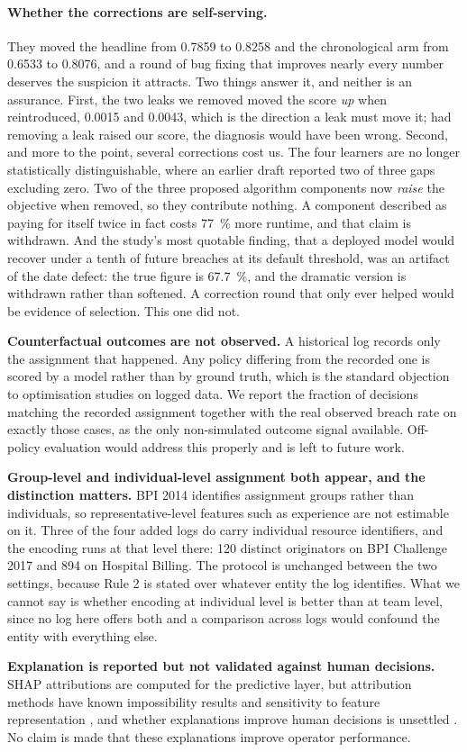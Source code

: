 \paragraph{Whether the corrections are self-serving.} They moved the headline from
\num{0.7859} to \num{0.8258} and the chronological arm from \num{0.6533} to \num{0.8076}, and a
round of bug fixing that improves nearly every number deserves the suspicion it attracts. Two
things answer it, and neither is an assurance. First, the two leaks we removed moved the score
\emph{up} when reintroduced, \num{0.0015} and \num{0.0043}, which is the direction a leak must move it;
had removing a leak raised our score, the diagnosis would have been wrong. Second, and more
to the point, several corrections cost us. The four learners are no longer statistically
distinguishable, where an earlier draft reported two of three gaps excluding zero. Two of
the three proposed algorithm components now \emph{raise} the objective when removed, so
they contribute nothing. A component described as paying for itself twice in fact costs
\SI{77}{\percent} more runtime, and that claim is withdrawn. And the study's most quotable finding,
that a deployed model would recover under a tenth of future breaches at its default
threshold, was an artifact of the date defect: the true figure is \SI{67.7}{\percent}, and the
dramatic version is withdrawn rather than softened. A correction round that only ever helped
would be evidence of selection. This one did not.

\textbf{Counterfactual outcomes are not observed.} A historical log records only the
assignment that happened. Any policy differing from the recorded one is scored by a model
rather than by ground truth, which is the standard objection to optimisation studies on
logged data. We report the fraction of decisions matching the recorded assignment together
with the real observed breach rate on exactly those cases, as the only non-simulated outcome
signal available. Off-policy evaluation would address this properly and is left to future
work.

\textbf{Group-level and individual-level assignment both appear, and the distinction matters.}
BPI 2014 identifies assignment groups rather than individuals, so representative-level features
such as experience are not estimable on it. Three of the four added logs do carry individual
resource identifiers, and the encoding runs at that level there: \num{120} distinct originators
on BPI Challenge 2017 and \num{894} on Hospital Billing. The protocol is unchanged between the
two settings, because Rule 2 is stated over whatever entity the log identifies. What we cannot
say is whether encoding at individual level is better than at team level, since no log here
offers both and a comparison across logs would confound the entity with everything else.

\textbf{Explanation is reported but not validated against human decisions.} SHAP attributions
are computed for the predictive layer, but attribution methods have known impossibility
results \citep{bilodeau2024impossibility} and sensitivity to feature representation
\citep{hwang2025shapbased}, and whether explanations improve human decisions is unsettled
\citep{haag2026explanations,chae2025explanation}. No claim is made that these explanations
improve operator performance.

